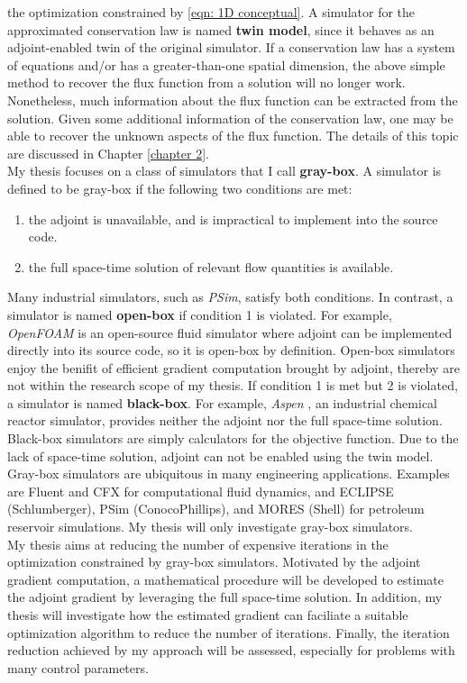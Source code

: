 the optimization constrained by \eqref{eqn: 1D conceptual}.
A simulator for the approximated conservation law is named \textbf{twin model}, since it behaves as an adjoint-enabled
twin of the original simulator.
If a conservation law has a system of equations and/or has a greater-than-one spatial dimension, 
the above simple method to recover the flux function from a solution will no longer work. 
Nonetheless, much information about the flux function can be extracted from the solution. 
Given some additional information of the conservation law, one may be able to recover the unknown aspects of the flux function. 
The details of this topic are discussed in Chapter \ref{chapter 2}.\\

My thesis focuses on a class of simulators that I call \textbf{gray-box}.
A simulator is defined to be gray-box if the following two conditions are met:
\begin{enumerate}
    \item the adjoint is unavailable, and is impractical to implement into the source code.
    \item the full space-time solution of relevant flow quantities is available.
\end{enumerate}
Many industrial simulators, such as \textit{PSim}, satisfy both conditions.
In contrast, a simulator is named \textbf{open-box} if condition 1 is violated.
For example, \textit{OpenFOAM} \cite{openfoam} is an open-source fluid simulator where adjoint can be implemented directly
into its source code, so it is open-box by definition. Open-box simulators enjoy the
benifit of efficient gradient computation brought by adjoint, thereby are not within the research
scope of my thesis. If condition 1 is met but 2 is violated, a simulator
is named \textbf{black-box}. For example, \textit{Aspen} \cite{aspen}, an industrial chemical reactor simulator, provides neither
the adjoint nor the full space-time solution. Black-box simulators are simply calculators
for the objective function. Due to the lack of space-time solution, adjoint can not be enabled
using the twin model. 
Gray-box simulators are ubiquitous in many engineering applications. Examples are Fluent \cite{fluent} and CFX \cite{cfx} for computational fluid
dynamics, and ECLIPSE (Schlumberger), PSim (ConocoPhillips), and MORES (Shell) for petroleum reservoir simulations.
My thesis will only investigate gray-box simulators.\\

My thesis aims at reducing the number of expensive iterations in the optimization constrained by
gray-box simulators. 
Motivated by the adjoint gradient computation, a mathematical procedure will be developed to estimate the
adjoint gradient by leveraging the full space-time solution. In addition,
my thesis will investigate how the estimated gradient can faciliate a suitable 
optimization algorithm to reduce the number of iterations. 
Finally, the iteration reduction achieved by my approach will be assessed, especially 
for problems with many control parameters.\\


